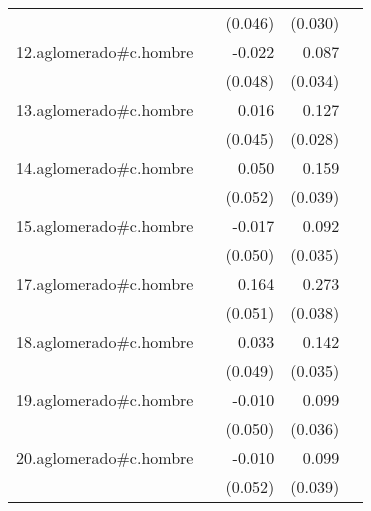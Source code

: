 {\begin{longtable}{l*{4}{D{.}{.}{-1}}}
            &                     &     (0.046)         &     (0.030)         &                     \\
\addlinespace
12.aglomerado#c.hombre&                     &      -0.022         &       0.087\sym{*}  &                     \\
            &                     &     (0.048)         &     (0.034)         &                     \\
\addlinespace
13.aglomerado#c.hombre&                     &       0.016         &       0.127\sym{***}&                     \\
            &                     &     (0.045)         &     (0.028)         &                     \\
\addlinespace
14.aglomerado#c.hombre&                     &       0.050         &       0.159\sym{***}&                     \\
            &                     &     (0.052)         &     (0.039)         &                     \\
\addlinespace
15.aglomerado#c.hombre&                     &      -0.017         &       0.092\sym{**} &                     \\
            &                     &     (0.050)         &     (0.035)         &                     \\
\addlinespace
17.aglomerado#c.hombre&                     &       0.164\sym{**} &       0.273\sym{***}&                     \\
            &                     &     (0.051)         &     (0.038)         &                     \\
\addlinespace
18.aglomerado#c.hombre&                     &       0.033         &       0.142\sym{***}&                     \\
            &                     &     (0.049)         &     (0.035)         &                     \\
\addlinespace
19.aglomerado#c.hombre&                     &      -0.010         &       0.099\sym{**} &                     \\
            &                     &     (0.050)         &     (0.036)         &                     \\
\addlinespace
20.aglomerado#c.hombre&                     &      -0.010         &       0.099\sym{*}  &                     \\
            &                     &     (0.052)         &     (0.039)         &                     \\

\end{longtable}}
